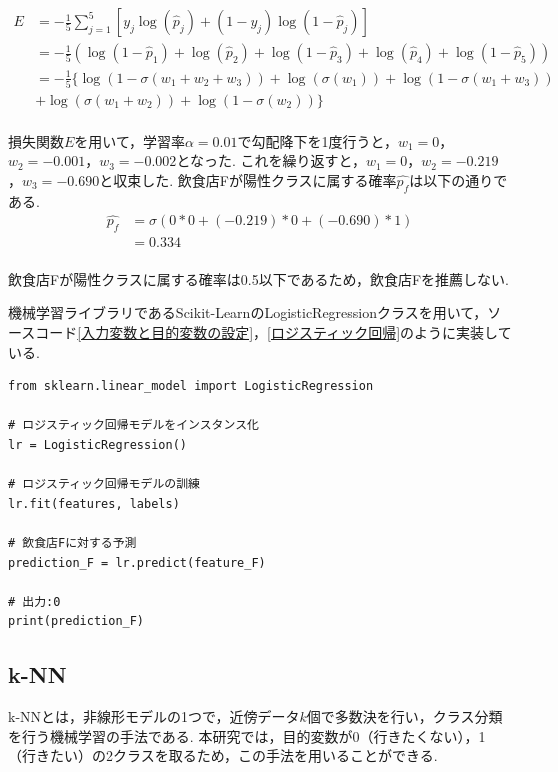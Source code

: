 \documentclass[12pt,a4j]{jreport}
\begin{document}
\begin{align*}
E &= - \frac{1}{5} \sum_{j=1}^{5} \left[ y_j \log(\hat{p}_j) + (1 - y_j) \log(1 - \hat{p}_j) \right]\\
&= - \frac{1}{5} ( \log(1 - \hat{p}_1) + \log(\hat{p}_2) + \log(1 - \hat{p}_3) + \log(\hat{p}_4) + \log(1 - \hat{p}_5))\\
&= - \frac{1}{5} \{ \log(1 - \sigma(w_1 + w_2 + w_3)) + \log(\sigma(w_1)) + \log(1 - \sigma(w_1 + w_3)) \\
&+ \log(\sigma(w_1 + w_2)) + \log(1 - \sigma(w_2))\}
\end{align*}\\
損失関数\( E \)を用いて，学習率\( \alpha = 0.01\)で勾配降下を1度行うと，\( w_1 = 0 \)，\( w_2 = -0.001 \)，\( w_3 = -0.002 \)となった.
これを繰り返すと，\( w_1 = 0 \)，\( w_2 = -0.219 \)，\( w_3 = -0.690 \)と収束した.
飲食店Fが陽性クラスに属する確率\(\hat{p_f}\)は以下の通りである.\\
\begin{align*}
  \hat{p_f} &= \sigma\left( 0 * 0 + (-0.219) * 0 + (-0.690) * 1\right) \\
  &= 0.334
\end{align*}\\
飲食店Fが陽性クラスに属する確率は0.5以下であるため，飲食店Fを推薦しない.

機械学習ライブラリであるScikit-LearnのLogisticRegressionクラスを用いて，ソースコード\ref{入力変数と目的変数の設定}，\ref{ロジスティック回帰}のように実装している.\\

\begin{lstlisting}[caption=ロジスティック回帰による予測,label=ロジスティック回帰]
from sklearn.linear_model import LogisticRegression

# ロジスティック回帰モデルをインスタンス化
lr = LogisticRegression()

# ロジスティック回帰モデルの訓練
lr.fit(features, labels)

# 飲食店Fに対する予測
prediction_F = lr.predict(feature_F)

# 出力:0
print(prediction_F)
\end{lstlisting}

\subsection{k-NN}
k-NNとは，非線形モデルの1つで，近傍データ\( k \)個で多数決を行い，クラス分類を行う機械学習の手法である.
本研究では，目的変数が0（行きたくない），1（行きたい）の2クラスを取るため，この手法を用いることができる.
\end{document}
